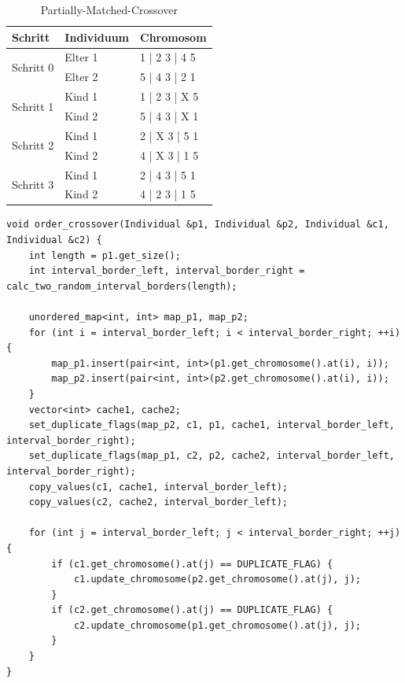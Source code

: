 \begin{table}[H]
\centering
\caption{Partially-Matched-Crossover}
\begin{tabularx}{0.5\textwidth}{l|l|l}
Schritt & Individuum & Chromosom\\
\hline
\multirow{2}{*}{Schritt 0}
		& Elter 1 & 1 | 2 3 | 4 5\\
		& Elter 2 & 5 | 4 3 | 2 1\\
\hline
\multirow{2}{*}{Schritt 1}
		& Kind 1 & 1 | 2 3 | X 5\\
		& Kind 2 & 5 | 4 3 | X 1\\
\hline
\multirow{2}{*}{Schritt 2}
		& Kind 1 & 2 | X 3 | 5 1\\
		& Kind 2 & 4 | X 3 | 1 5\\
\hline
\multirow{2}{*}{Schritt 3}
		& Kind 1 & 2 | 4 3 | 5 1\\
		& Kind 2 & 4 | 2 3 | 1 5\\
\end{tabularx}
\label{tab:ox}
\end{table}


\begin{minipage}{\linewidth}
\begin{lstlisting}[caption={Order-Crossover}, firstnumber=1, captionpos=b, label=lst:ox]
void order_crossover(Individual &p1, Individual &p2, Individual &c1, Individual &c2) {
	int length = p1.get_size();
	int interval_border_left, interval_border_right = calc_two_random_interval_borders(length);

	unordered_map<int, int> map_p1, map_p2;
	for (int i = interval_border_left; i < interval_border_right; ++i) {
		map_p1.insert(pair<int, int>(p1.get_chromosome().at(i), i));
		map_p2.insert(pair<int, int>(p2.get_chromosome().at(i), i));
	}
	vector<int> cache1, cache2;
	set_duplicate_flags(map_p2, c1, p1, cache1, interval_border_left, interval_border_right);
	set_duplicate_flags(map_p1, c2, p2, cache2, interval_border_left, interval_border_right);
	copy_values(c1, cache1, interval_border_left);
	copy_values(c2, cache2, interval_border_left);

	for (int j = interval_border_left; j < interval_border_right; ++j) {
		if (c1.get_chromosome().at(j) == DUPLICATE_FLAG) {
			c1.update_chromosome(p2.get_chromosome().at(j), j);
		}
		if (c2.get_chromosome().at(j) == DUPLICATE_FLAG) {
			c2.update_chromosome(p1.get_chromosome().at(j), j);
		}
	}
}
\end{lstlisting}
\end{minipage}
